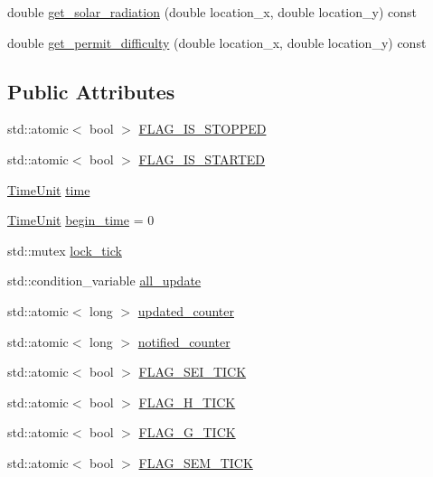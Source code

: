 {\bf }\par
\begin{DoxyCompactItemize}
\item 
double \hyperlink{classsolar__core_1_1_w_a39001b1adeb816c80cb63637801c4b9c}{get\+\_\+solar\+\_\+radiation} (double location\+\_\+x, double location\+\_\+y) const 
\item 
double \hyperlink{classsolar__core_1_1_w_a7906874c5180d8114e1acba095ace3f5}{get\+\_\+permit\+\_\+difficulty} (double location\+\_\+x, double location\+\_\+y) const 
\end{DoxyCompactItemize}

\subsection*{Public Attributes}
{\bf }\par
\begin{DoxyCompactItemize}
\item 
std\+::atomic$<$ bool $>$ \hyperlink{classsolar__core_1_1_w_a9bb998c65a7427961de179f41e25daea}{F\+L\+A\+G\+\_\+\+I\+S\+\_\+\+S\+T\+O\+P\+P\+E\+D}
\item 
std\+::atomic$<$ bool $>$ \hyperlink{classsolar__core_1_1_w_a8456f88d45f2e8bf67eccd7f0c8d08fa}{F\+L\+A\+G\+\_\+\+I\+S\+\_\+\+S\+T\+A\+R\+T\+E\+D}
\item 
\hyperlink{namespacesolar__core_a4b5949d07259da6f8a20d12a30403e90}{Time\+Unit} \hyperlink{classsolar__core_1_1_w_ae96b30122adc9fae8fc2f209a4c89b0a}{time}
\item 
\hyperlink{namespacesolar__core_a4b5949d07259da6f8a20d12a30403e90}{Time\+Unit} \hyperlink{classsolar__core_1_1_w_aec1b9014ad296dc9b8b132ba9b67c08a}{begin\+\_\+time} = 0
\item 
std\+::mutex \hyperlink{classsolar__core_1_1_w_a56ba20ee51f5db7288e55bb65f12511b}{lock\+\_\+tick}
\item 
std\+::condition\+\_\+variable \hyperlink{classsolar__core_1_1_w_aa6cba0dba8a566978e51fb4204aac4b9}{all\+\_\+update}
\item 
std\+::atomic$<$ long $>$ \hyperlink{classsolar__core_1_1_w_a775d817c6117b462571c3fca62fe0c86}{updated\+\_\+counter}
\item 
std\+::atomic$<$ long $>$ \hyperlink{classsolar__core_1_1_w_afee32d515534826a60ddf12936f85a3d}{notified\+\_\+counter}
\item 
std\+::atomic$<$ bool $>$ \hyperlink{classsolar__core_1_1_w_a65d2047e574ed6201a8e21ec1ba1bec4}{F\+L\+A\+G\+\_\+\+S\+E\+I\+\_\+\+T\+I\+C\+K}
\item 
std\+::atomic$<$ bool $>$ \hyperlink{classsolar__core_1_1_w_a4cd32940e21bfc20919cc2d4447d66d3}{F\+L\+A\+G\+\_\+\+H\+\_\+\+T\+I\+C\+K}
\item 
std\+::atomic$<$ bool $>$ \hyperlink{classsolar__core_1_1_w_aae63ce0d440f2c8d475d6eeafac58238}{F\+L\+A\+G\+\_\+\+G\+\_\+\+T\+I\+C\+K}
\item 
std\+::atomic$<$ bool $>$ \hyperlink{classsolar__core_1_1_w_ae383b7a595cb28d52aa747fc7e5bb619}{F\+L\+A\+G\+\_\+\+S\+E\+M\+\_\+\+T\+I\+C\+K}
\end{DoxyCompactItemize}

